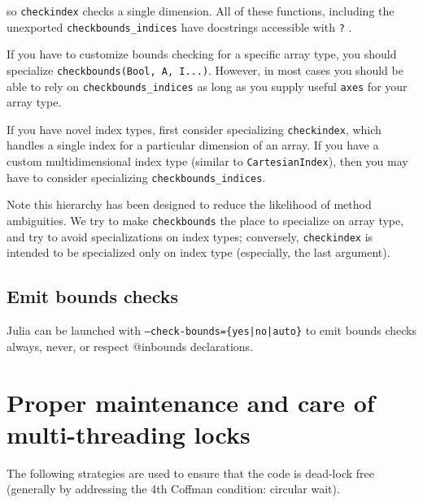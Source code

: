 so \texttt{checkindex} checks a single dimension.  All of these functions, including the unexported \texttt{checkbounds\_indices} have docstrings accessible with \texttt{?} .



If you have to customize bounds checking for a specific array type, you should specialize \texttt{checkbounds(Bool, A, I...)}. However, in most cases you should be able to rely on \texttt{checkbounds\_indices} as long as you supply useful \texttt{axes} for your array type.



If you have novel index types, first consider specializing \texttt{checkindex}, which handles a single index for a particular dimension of an array.  If you have a custom multidimensional index type (similar to \texttt{CartesianIndex}), then you may have to consider specializing \texttt{checkbounds\_indices}.



Note this hierarchy has been designed to reduce the likelihood of method ambiguities.  We try to make \texttt{checkbounds} the place to specialize on array type, and try to avoid specializations on index types; conversely, \texttt{checkindex} is intended to be specialized only on index type (especially, the last argument).



\hypertarget{15511139749343586557}{}


\subsection{Emit bounds checks}



Julia can be launched with \texttt{--check-bounds=\{yes|no|auto\}} to emit bounds checks always, never, or respect @inbounds declarations.



\hypertarget{17038639605096915302}{}


\section{Proper maintenance and care of multi-threading locks}



The following strategies are used to ensure that the code is dead-lock free (generally by addressing the 4th Coffman condition: circular wait).



